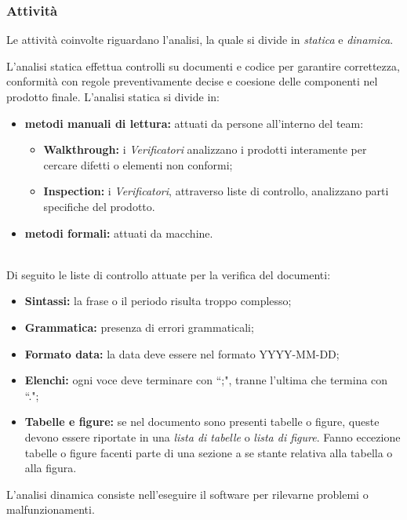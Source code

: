 \subsubsection{Attività}
Le attività coinvolte riguardano l'analisi, la quale si divide in \textit{statica} e \textit{dinamica}.

L'analisi statica effettua controlli su documenti e codice per garantire correttezza, conformità con regole preventivamente decise e coesione delle componenti nel prodotto finale.
L'analisi statica si divide in:
\begin{itemize}
	\item \textbf{metodi manuali di lettura:} attuati da persone all'interno del team:
	\begin{itemize}
		\item \textbf{Walkthrough:} i \textit{Verificatori} analizzano i prodotti interamente per cercare difetti o elementi non conformi;
		\item \textbf{Inspection:} i \textit{Verificatori}, attraverso liste di controllo, analizzano parti specifiche del prodotto.
	\end{itemize}
	\item \textbf{metodi formali:} attuati da macchine.
\end{itemize}
\mbox{}\\
Di seguito le liste di controllo attuate per la verifica del documenti:
\begin{itemize}
	\item \textbf{Sintassi:} la frase o il periodo risulta troppo complesso;
	\item \textbf{Grammatica:} presenza di errori grammaticali;
	\item \textbf{Formato data:} la data deve essere nel formato YYYY-MM-DD;
	\item \textbf{Elenchi:} ogni voce deve terminare con ``;", tranne l'ultima che termina con ``.";
	\item \textbf{Tabelle e figure:} se nel documento sono presenti tabelle o figure, queste devono essere riportate in una \textit{lista di tabelle} o \textit{lista di figure}. Fanno eccezione tabelle o figure facenti parte di una sezione a se stante relativa alla tabella o alla figura.
\end{itemize}



\label{3.4.4.2}
L'analisi dinamica consiste nell'eseguire il software per rilevarne problemi o malfunzionamenti.

